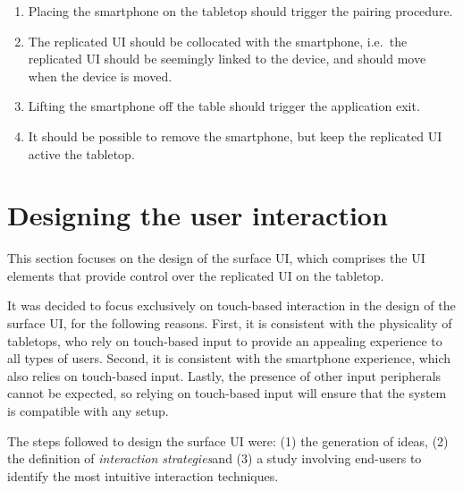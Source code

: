 \begin{enumerate}[{RD}-1]
\item Placing the smartphone on the tabletop should trigger the pairing procedure.
\item The replicated UI should be collocated with the smartphone, i.e.\ the replicated UI should be seemingly linked to the device, and should move when the device is moved.
\item Lifting the smartphone off the table should trigger the application exit.
\item It should be possible to remove the smartphone, but keep the replicated UI active the tabletop.
\end{enumerate}


\section{Designing the user interaction}
\label{sec:interaction}

This section focuses on the design of the surface UI, which comprises the UI elements that provide control over the replicated UI on the tabletop.

It was decided to focus exclusively on touch-based interaction in the design of the surface UI, for the following reasons.
First, it is consistent with the physicality of tabletops, who rely on touch-based input to provide an appealing experience to all types of users.
Second, it is consistent with the smartphone experience, which also relies on touch-based input.
Lastly, the presence of other input peripherals cannot be expected, so relying on touch-based input will ensure that the system is compatible with any setup.

The steps followed to design the surface UI were: (1) the generation of ideas, (2) the definition of \emph{interaction strategies}and (3) a study involving end-users to identify the most intuitive interaction techniques.


